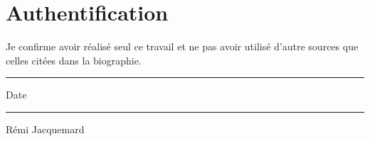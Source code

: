 \chapter*{Authentification}
\thispagestyle{empty}
Je confirme avoir réalisé seul ce travail et ne pas avoir utilisé d'autre sources que celles citées dans la biographie. 

\vspace*{5cm}


\begin{multicols}{2}
 
 \noindent\rule[0.5ex]{\linewidth}{1pt}
 Date
 
 \columnbreak
 
 \noindent\rule[0.5ex]{\linewidth}{1pt}
 Rémi Jacquemard
 
\end{multicols}